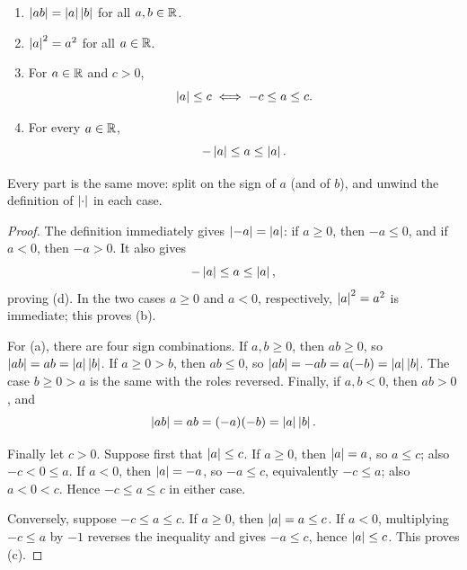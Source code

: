 \begin{theorem}\label{thm:abs-value}
    \leavevmode
    \begin{enumerate} [label = (\alph*)]
        \item $\left|ab\right| = \left|a\right|\left|b\right|$ for all $a, b \in \mathbb{R}$.
        \item $\left|a\right|^2 = a^2$ for all $a \in \mathbb{R}$.
        \item For $a \in \mathbb{R}$ and $c>0$,
        \[\left|a\right| \leq c \iff -c \leq a \leq c.\]
        \item For every $a \in \mathbb{R}$,
        \[-\left|a\right| \leq a \leq \left|a\right|.\]

    \end{enumerate}
\end{theorem}

\begin{idea}
    Every part is the same move: split on the sign of $a$ (and of $b$), and
    unwind the definition of $\left|\cdot\right|$ in each case.
\end{idea}

\begin{proof}
    The definition immediately gives $\left|-a\right|=\left|a\right|$: if $a\geq0$,
    then $-a\leq0$, and if $a<0$, then $-a>0$. It also gives
    \begin{equation*}
        -\left|a\right|\leq a\leq\left|a\right|,
    \end{equation*}
    proving (d). In the two cases $a\geq0$ and $a<0$, respectively,
    $\left|a\right|^2=a^2$ is immediate; this proves (b).

    For (a), there are four sign combinations. If $a,b\geq0$, then
    $ab\geq0$, so $\left|ab\right|=ab=\left|a\right|\left|b\right|$. If $a\geq0>b$, then
    $ab\leq0$, so $\left|ab\right|=-ab=a(-b)=\left|a\right|\left|b\right|$. The case
    $b\geq0>a$ is the same with the roles reversed. Finally, if $a,b<0$,
    then $ab>0$, and
    \begin{equation*}
        \left|ab\right|=ab=(-a)(-b)=\left|a\right|\left|b\right|.
    \end{equation*}

    Finally let $c>0$. Suppose first that $\left|a\right|\leq c$. If $a\geq0$,
    then $\left|a\right|=a$, so $a\leq c$; also $-c<0\leq a$. If $a<0$, then
    $\left|a\right|=-a$, so $-a\leq c$, equivalently $-c\leq a$; also $a<0<c$.
    Hence $-c\leq a\leq c$ in either case.

    Conversely, suppose $-c\leq a\leq c$. If $a\geq0$, then
    $\left|a\right|=a\leq c$. If $a<0$, multiplying $-c\leq a$ by $-1$ reverses
    the inequality and gives $-a\leq c$, hence $\left|a\right|\leq c$. This proves (c).
\end{proof}


